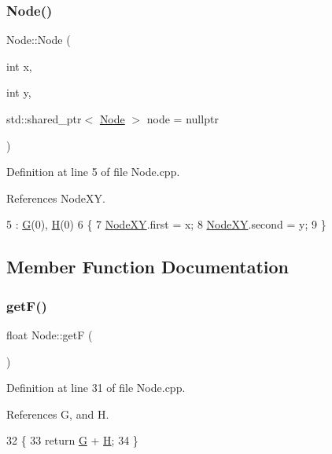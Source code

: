 \subsubsection{\texorpdfstring{Node()}{Node()}\hspace{0.1cm}{\footnotesize\ttfamily [2/2]}}
{\footnotesize\ttfamily Node\+::\+Node (\begin{DoxyParamCaption}\item[{int}]{x,  }\item[{int}]{y,  }\item[{std\+::shared\+\_\+ptr$<$ \hyperlink{class_node}{Node} $>$}]{node = {\ttfamily nullptr} }\end{DoxyParamCaption})}



Definition at line 5 of file Node.\+cpp.



References Node\+XY.


\begin{DoxyCode}
5                                                  : \hyperlink{class_node_a3c6a67023068f762eaaa8a4861ab3e9f}{G}(0), \hyperlink{class_node_a26426055f336a81dc05680b981e4c270}{H}(0)
6 \{
7     \hyperlink{class_node_ac85b927d8c9cdc484f169129d317f6f0}{NodeXY}.first = x;
8     \hyperlink{class_node_ac85b927d8c9cdc484f169129d317f6f0}{NodeXY}.second = y;
9 \}
\end{DoxyCode}


\subsection{Member Function Documentation}
\mbox{\label{class_node_af483f2ed468aad829701a0ca7ba68966}} 
\subsubsection{\texorpdfstring{get\+F()}{getF()}}
{\footnotesize\ttfamily float Node\+::getF (\begin{DoxyParamCaption}{ }\end{DoxyParamCaption})}



Definition at line 31 of file Node.\+cpp.



References G, and H.


\begin{DoxyCode}
32 \{
33     \textcolor{keywordflow}{return} \hyperlink{class_node_a3c6a67023068f762eaaa8a4861ab3e9f}{G} + \hyperlink{class_node_a26426055f336a81dc05680b981e4c270}{H};
34 \}
\end{DoxyCode}
\mbox{\label{class_node_a9133c5c2e1c994b914535bbbefa33d7c}} 
